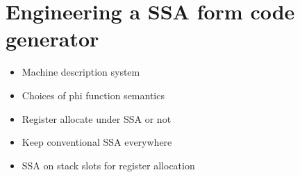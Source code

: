 \section{Engineering a SSA form code generator}
\label{sec:ssa-codegen-engineering}

\begin{itemize}

\item Machine description system

\item Choices of phi function semantics

\item Register allocate under SSA or not

\item Keep conventional SSA everywhere

\item SSA on stack slots for register allocation

\end{itemize}














